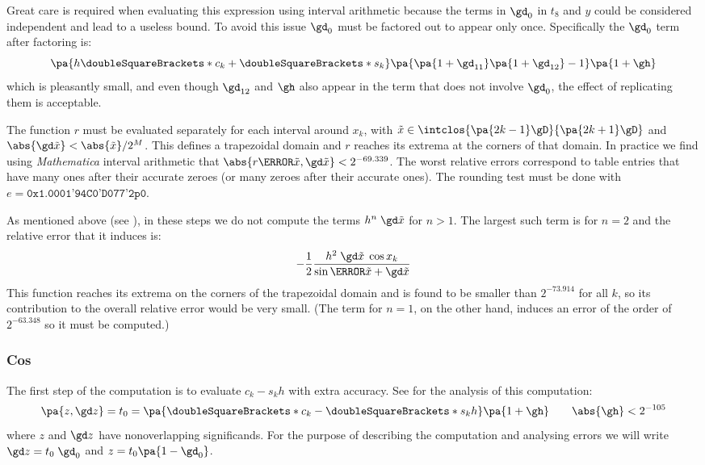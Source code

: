 \documentclass[10pt, a4paper, twoside]{basestyle}
\newcommand{\round}[1]{\doubleSquareBrackets*{#1}}
\newcommand{\red}[1]{\tilde{#1}}
\begin{document}
Great care is required when evaluating this expression using interval arithmetic because the terms in $\gd_0$ in $t_8$ and $y$ could be considered independent and lead to a useless bound.  To avoid this issue $\gd_0$ must be factored out to appear only once.  Specifically the $\gd_0$ term after factoring is:
\[
\pa{h \round{c_k} + \round{s_k}} \pa{\pa{1 + \gd_{11}} \pa{1 + \gd_{12}} - 1} \pa{1 + \gh}
\]
which is pleasantly small, and even though $\gd_{12}$ and $\gh$ also appear in the term that does not involve $\gd_0$, the effect of replicating them is acceptable.

The function $r$ must be evaluated separately for each interval around $x_k$, with $\red x \in \intclos{\pa{2 k - 1}\gD}{\pa{2 k + 1}\gD}$ and $\abs{\gd \red x} < {\abs{\red x}} / 2^M$.  This defines a trapezoidal domain and $r$ reaches its extrema at the corners of that domain.  In practice we find using \textit{Mathematica} interval arithmetic that $\abs{r\of{\red x, \gd \red x}} < 2^{-69.339}$.  The worst relative errors correspond to table entries that have many ones after their accurate zeroes (or many zeroes after their accurate ones).  The rounding test must be done with $e = \texttt{0x1.0001'94C0'D077'2p0}$.

As mentioned above (see ), in these steps we do not compute the terms $h^n \; \gd \red x$ for $n > 1$.  The largest such term is for $n = 2$ and the relative error that it induces is:
\[
-\frac{1}{2}\frac{h^2 \; \gd \red x \; \cos x_k}{\sin\of{\red x + \gd \red x}}
\]
This function reaches its extrema on the corners of the trapezoidal domain and is found to be smaller than $2^{-73.914}$ for all $k$, so its contribution to the overall relative error would be very small.  (The term for $n = 1$, on the other hand, induces an error of the order of $2^{-63.348}$ so it must be computed.)

\subsubsection*{Cos}\label{secerroranalysiscos}

The first step of the computation is to evaluate $c_k - s_k h$ with extra accuracy.  See  for the analysis of this computation:
\[
\pa{z, \gd z} = t_0 = \pa{\round{c_k} - \round{s_k} h} \pa{1 + \gh} \qquad \abs{\gh} < 2^{-105}
\]
where $z$ and $\gd z$ have nonoverlapping significands.  For the purpose of describing the computation and analysing errors we will write $\gd z = t_0 \; \gd_0$ and $z = t_0 \pa{1 - \gd_0}$.
\end{document}
